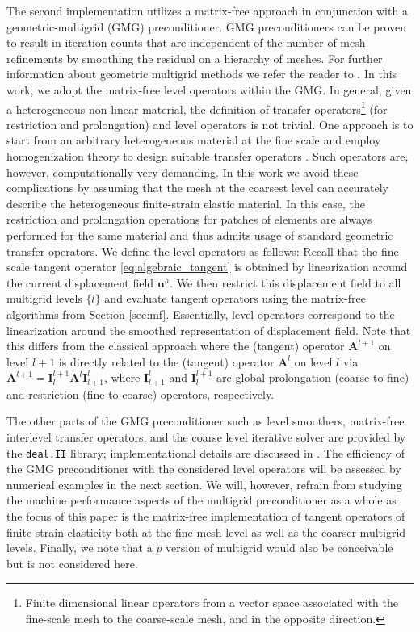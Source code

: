 \documentclass[AMA,STIX1COL]{WileyNJD-v2}
\newcommand*{\gz}[1]{\boldsymbol{#1}}
\begin{document}
The second implementation utilizes a matrix-free approach in conjunction with a geometric-multigrid (GMG) preconditioner.
GMG preconditioners \cite{Bramble1990, Briggs2000, Janssen2011,May2015} can be proven to result in iteration counts that are independent of the number of mesh refinements by smoothing the residual on a hierarchy of meshes.
For further information about geometric multigrid methods we refer the reader to \cite{Briggs2000,Hackbusch1985,Wesseling1992}.
%
%
In this work, we adopt the matrix-free level operators within the GMG.
In general, given a heterogeneous non-linear material, the definition of transfer operators\footnote{Finite dimensional linear operators from a vector space associated with the fine-scale mesh to the coarse-scale mesh, and in the opposite direction.} (for restriction and prolongation) and level operators is not trivial. One approach is to start from an arbitrary heterogeneous material at the fine scale and employ homogenization theory \cite{Suquet1987, Hill1972,Hashin1983,Castaneda1997} to design suitable transfer operators \cite{Miehe2007}.
Such operators are, however, computationally very demanding.
In this work we avoid these complications by assuming
that the mesh at the coarsest level can accurately describe the heterogeneous finite-strain elastic material.
In this case, the restriction and prolongation operations for patches of elements are always performed for the same material and thus admits usage of standard geometric transfer operators.
We define the level operators as follows: Recall that the fine scale tangent operator \eqref{eq:algebraic_tangent} is obtained by linearization around the current displacement field $\gz u^h$. We then restrict this displacement field to all multigrid levels $\{l\}$ and evaluate tangent operators using the matrix-free algorithms from Section \ref{sec:mf}.
Essentially, level operators correspond to the linearization around the smoothed representation of displacement field.
Note that this differs from the classical approach where the (tangent) operator $\gz A^{l+1}$ on level $l+1$ is directly related to the (tangent) operator $\gz A^{l}$ on level $l$ via $\gz A^{l+1}=\gz I^{l+1}_{l} \gz A^l \gz I^l_{l+1}$, where $\gz I^l_{l+1}$ and $\gz I^{l+1}_l$ are global prolongation (coarse-to-fine) and restriction (fine-to-coarse) operators, respectively.

The other parts of the GMG preconditioner such as level smoothers, matrix-free interlevel transfer operators, and the coarse level iterative solver are provided by the \texttt{deal.II} library; implementational details are discussed in \cite{Clevenger2018}.
%
The efficiency of the GMG preconditioner with the considered level operators will be assessed by numerical examples in the next section.
We will, however, refrain from studying the machine performance aspects of the multigrid preconditioner as a whole as the focus of this paper is the matrix-free implementation of tangent operators of finite-strain elasticity both at the fine mesh level as well as the coarser multigrid levels.
%
Finally, we note that a $p$ version of multigrid \cite{Ronquist1987} would also be conceivable but is not considered here.
\end{document}
